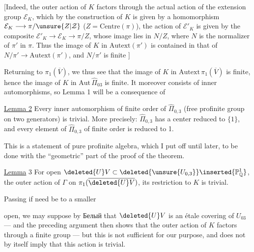 
[Indeed, the outer action of $K$ factors through the actual action of the extension group $\mathcal E_K$, which by the construction of $K$ is given by a homomorphism $\mathcal E_K\longrightarrow\pi/\unsure{Z|\mathcal Z}$ ($Z=\mathrm{Centre}(\pi)$),  the  action of $\mathcal E'_K$ is given by the composite $\mathcal E'_K\longrightarrow\mathcal E_K\longrightarrow\pi/Z$, whose image lies in $N/Z$, where $N$ is the normalizer of $\pi'$ in $\pi$. Thus the image of $K$ in $\mathrm{Autext}(\pi')$ is contained in that of $N/\pi'\longrightarrow\mathrm{Autext}(\pi')$, and $N/\pi'$ is finite ]


Returning to $\pi_1(\overline V)$, we thus see that the image of $K$ in $\mathrm{Autext}\,\pi_1(\overline V)$ is finite, hence the image of $K$ in $\mathrm{Aut}\,\widehat{\Pi}_{03}$ is finite. It moreover consists of inner automorphisms, so Lemma 1 will be a consequence of

\uline{Lemma 2} Every inner automorphism of finite order of $\widehat{\Pi}_{0,3}$ (free profinite group on two generators) is trivial. More precisely: $\widehat{\Pi}_{0,3}$ has a center reduced to $\{1\}$, and every element of $\widehat{\Pi}_{0,3}$ of finite order is reduced to 1.

This is a statement of pure profinite algebra, which I put off until later, to be done with the ``geometric'' part of the proof of the theorem.

\uline{Lemma} 3 For   open $\deleted{U}V\subset\deleted{\unsure{U_{0,3}}}\inserted{\mathbb P^1_{\mathbb Q}}$,  the outer action of $\Gamma$ on $\pi_1(\overline{\deleted{U}V})$, its restriction to $K$ is trivial.

Passing if need be to a smaller


open, we may suppose by Белый that $\deleted{U}V$ is an étale covering of $U_{03}$ --- and the preceding argument then shows that the outer action of $K$ factors through a finite  group --- but this is not sufficient for our purpose, and does not by itself imply that this action is trivial.

